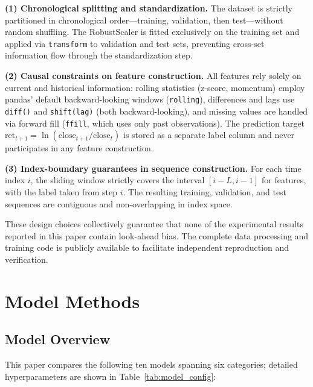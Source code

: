 \documentclass[a4paper]{cas-dc}
\begin{document}
\textbf{(1) Chronological splitting and standardization.} The dataset is strictly partitioned in chronological order---training, validation, then test---without random shuffling. The RobustScaler is fitted exclusively on the training set and applied via \texttt{transform} to validation and test sets, preventing cross-set information flow through the standardization step.

\textbf{(2) Causal constraints on feature construction.} All features rely solely on current and historical information: rolling statistics (z-score, momentum) employ pandas' default backward-looking windows (\texttt{rolling}), differences and lags use \texttt{diff()} and \texttt{shift(lag)} (both backward-looking), and missing values are handled via forward fill (\texttt{ffill}, which uses only past observations). The prediction target $\text{ret}_{t+1} = \ln(\text{close}_{t+1} / \text{close}_t)$ is stored as a separate label column and never participates in any feature construction.

\textbf{(3) Index-boundary guarantees in sequence construction.} For each time index $i$, the sliding window strictly covers the interval $[i-L, i-1]$ for features, with the label taken from step $i$. The resulting training, validation, and test sequences are contiguous and non-overlapping in index space.

These design choices collectively guarantee that none of the experimental results reported in this paper contain look-ahead bias. The complete data processing and training code is publicly available to facilitate independent reproduction and verification.

\section{Model Methods}

\subsection{Model Overview}

This paper compares the following ten models spanning six categories; detailed hyperparameters are shown in Table~\ref{tab:model_config}:
\end{document}
